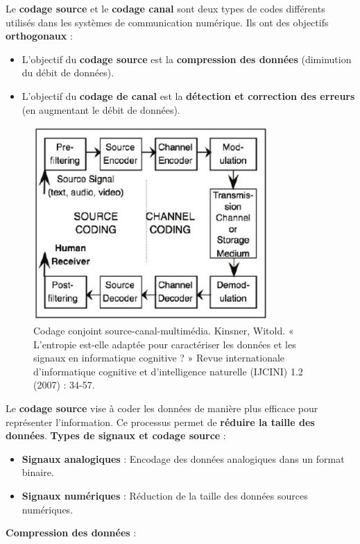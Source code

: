 Le \textbf{codage source} et le \textbf{codage canal} sont deux types de codes différents utilisés dans les systèmes de communication numérique.  
Ils ont des objectifs \textbf{orthogonaux} :
\begin{itemize}
    \item L'objectif du \textbf{codage source} est la \textbf{compression des données} (diminution du débit de données).
    \item L'objectif du \textbf{codage de canal} est la \textbf{détection et correction des erreurs} (en augmentant le débit de données).
\end{itemize}
\begin{figure}[H] %
    \centering
    \includegraphics[width=0.8\textwidth]{figures/6-21.jpg}
    \caption{Codage conjoint source-canal-multimédia. Kinsner, Witold. « L'entropie est-elle adaptée pour caractériser les données et les signaux en informatique cognitive ? » Revue internationale d'informatique cognitive et d'intelligence naturelle (IJCINI) 1.2 (2007) : 34-57.}
    \label{fig:communication2}
\end{figure}
Le \textbf{codage source} vise à coder les données de manière plus efficace pour représenter l'information.  
Ce processus permet de \textbf{réduire la taille des données}.  
\textbf{Types de signaux et codage source} :
\begin{itemize}
    \item \textbf{Signaux analogiques} : Encodage des données analogiques dans un format binaire.
    \item \textbf{Signaux numériques} : Réduction de la taille des données sources numériques.
\end{itemize}
\textbf{Compression des données} :  
